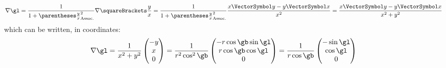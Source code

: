 \documentclass[10pt, a4paper, oneside]{basestyle}
\begin{document}
\[
\grad \gl = \frac{1}{1 + \pa{\frac{y}{x}}^2} \grad\of{\frac{y}{x}}
= \frac{1}{1 + \pa{\frac{y}{x}}^2}\frac{x \vy - y \vx}{x^2}
= \frac{x \vy - y \vx}{x^2 + y^2}
\]
which can be written, in coordinates:
\[
\grad \gl = \frac{1}{x^2 + y^2}\begin{pmatrix}
-y \\
x \\
0
\end{pmatrix}
= \frac{1}{r^2 \cos^2 \gb}\begin{pmatrix}
-r \cos \gb \sin \gl \\
r \cos \gb \cos \gl \\
0
\end{pmatrix}
= \frac{1}{r \cos \gb}\begin{pmatrix}
-\sin \gl \\
\cos \gl \\
0
\end{pmatrix}
\]
\end{document}
